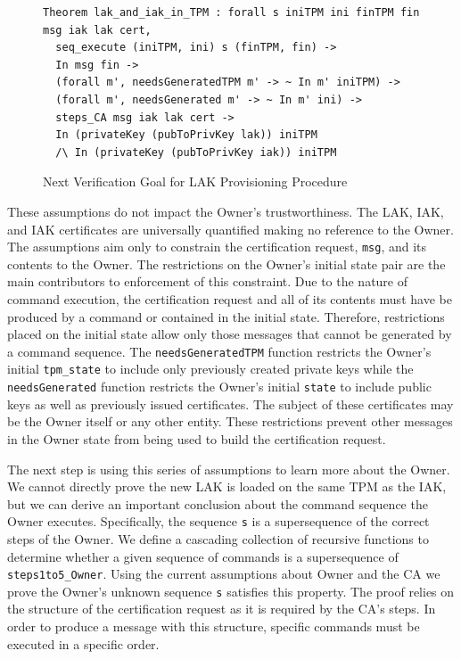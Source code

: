 \documentclass[runningheads]{llncs}
\begin{document}
\begin{figure}[hbtp]
\begin{lstlisting}[language=Coq]
Theorem lak_and_iak_in_TPM : forall s iniTPM ini finTPM fin msg iak lak cert,
  seq_execute (iniTPM, ini) s (finTPM, fin) -> 
  In msg fin ->
  (forall m', needsGeneratedTPM m' -> ~ In m' iniTPM) ->
  (forall m', needsGenerated m' -> ~ In m' ini) ->
  steps_CA msg iak lak cert ->
  In (privateKey (pubToPrivKey lak)) iniTPM
  /\ In (privateKey (pubToPrivKey iak)) iniTPM
\end{lstlisting}
\caption{Next Verification Goal for LAK Provisioning Procedure}
\label{fig:lak_goal}
\end{figure}

These assumptions do not impact the Owner's trustworthiness. The LAK,
IAK, and IAK certificates are universally quantified making no
reference to the Owner. The assumptions aim only to constrain the
certification request, \verb|msg|, and its contents to the Owner.  The
restrictions on the Owner's initial state pair are the main
contributors to enforcement of this constraint. Due to the nature of
command execution, the certification request and all of its contents
must have be produced by a command or contained in the initial state.
Therefore, restrictions placed on the initial state allow only those
messages that cannot be generated by a command sequence.  The
\verb|needsGeneratedTPM| function restricts the Owner's initial
\verb|tpm_state| to include only previously created private keys while
the \verb|needsGenerated| function restricts the Owner's initial
\verb|state| to include public keys as well as previously issued
certificates.  The subject of these certificates may be the Owner
itself or any other entity.  These restrictions prevent other messages
in the Owner state from being used to build the certification request.

The next step is using this series of assumptions to learn more about
the Owner. We cannot directly prove the new LAK is loaded on the same
TPM as the IAK, but we can derive an important conclusion about the
command sequence the Owner executes. Specifically, the sequence
\verb|s| is a supersequence of the correct steps of the Owner.  We
define a cascading collection of recursive functions to determine
whether a given sequence of commands is a supersequence of
\verb|steps1to5_Owner|.  Using the current assumptions about Owner and
the CA we prove the Owner's unknown sequence \verb|s| satisfies
this property. The proof relies on the structure of the
certification request as it is required by the CA's steps. In order to
produce a message with this structure, specific commands must be
executed in a specific order.
\end{document}
